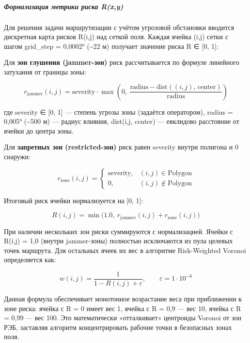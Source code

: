 \hypertarget{ux444ux43eux440ux43cux430ux43bux438ux437ux430ux446ux438ux44f-ux43cux435ux442ux440ux438ux43aux438-ux440ux438ux441ux43aux430-rxy}{%
\subparagraph{Формализация метрики риска R(x,y)}\label{ux444ux43eux440ux43cux430ux43bux438ux437ux430ux446ux438ux44f-ux43cux435ux442ux440ux438ux43aux438-ux440ux438ux441ux43aux430-rxy}}

Для решения задачи маршрутизации с учётом угрозовой обстановки вводится дискретная карта рисков R(i,j) над сеткой поля. Каждая ячейка (i,j) сетки с шагом grid\_step = 0,0002° (\textasciitilde22 м) получает значение риска R ∈ {[}0, 1{]}:

Для \textbf{зон глушения (jammer-зон)} риск рассчитывается по формуле линейного затухания от границы зоны:

\[r_{\mathrm{jammer}}(i,j) = \mathrm{severity} \cdot \max\!\left(0,\ \frac{\mathrm{radius} - \mathrm{dist}((i,j),\, \mathrm{center})}{\mathrm{radius}}\right)\]

где severity ∈ {[}0, 1{]} --- степень угрозы зоны (задаётся оператором), radius = 0,005° (\textasciitilde500 м) --- радиус влияния, dist(i,j, center) --- евклидово расстояние от ячейки до центра зоны.

Для \textbf{запретных зон (restricted-зон)} риск равен severity внутри полигона и 0 снаружи:

\[r_{\mathrm{zone}}(i,j) = \begin{cases} \mathrm{severity}, & (i,j) \in \mathrm{Polygon} \\ 0, & (i,j) \notin \mathrm{Polygon} \end{cases}\]

Итоговый риск ячейки нормализуется на {[}0, 1{]}:

\[R(i,j) = \min\!\bigl(1.0,\ r_{\mathrm{jammer}}(i,j) + r_{\mathrm{zone}}(i,j)\bigr)\]

При наличии нескольких зон риски суммируются с нормализацией. Ячейки с R(i,j) = 1,0 (внутри jammer-зоны) полностью исключаются из пула целевых точек маршрута. Для остальных ячеек их вес в алгоритме Risk-Weighted Voronoi определяется как:

\[w(i,j) = \frac{1}{1 - R(i,j) + \varepsilon},\qquad \varepsilon = 1 \cdot 10^{-6}\]

Данная формула обеспечивает монотонное возрастание веса при приближении к зоне риска: ячейка с R = 0 имеет вес 1, ячейка с R = 0,9 --- вес 10, ячейка с R = 0,99 --- вес 100. Это математически «отталкивает» центроиды Voronoi от зон РЭБ, заставляя алгоритм концентрировать рабочие точки в безопасных зонах поля.

